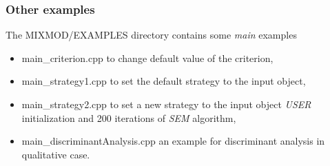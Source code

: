 \subsubsection{Other examples\\}
The MIXMOD/EXAMPLES directory contains some {\it main} examples
\begin{itemize}
	\item main\_criterion.cpp to change default value of the criterion,
	\item main\_strategy1.cpp to set the default strategy to the input object,
\item main\_strategy2.cpp to set a new strategy to the input object {\it USER} initialization and 200 iterations of {\it SEM} algorithm,
	\item main\_discriminantAnalysis.cpp an example for discriminant analysis in qualitative case.
\end{itemize}


